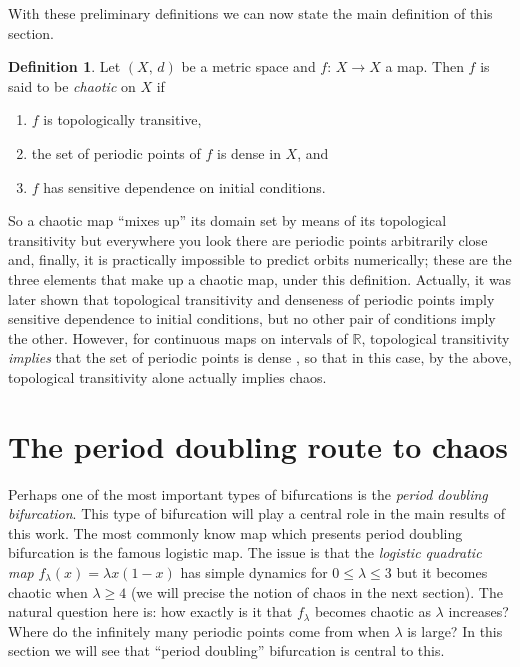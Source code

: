 \documentclass[10pt,twoside,titlepage]{book}
\numberwithin{equation}{chapter}
\numberwithin{figure}{chapter}
\numberwithin{table}{chapter}
\theoremstyle{plain}%
\theoremstyle{definition}
\newtheorem{defn}{Definition}[chapter]
\theoremstyle{remark}
\begin{document}
With these preliminary definitions we can now state the main definition of this section.

\begin{defn}
	Let $(X,\,d)$ be a metric space and $f:\,X\rightarrow X$ a map. Then $f$ is said to be \emph{chaotic} on $X$ if
	\begin{enumerate}
		\item $f$ is topologically transitive,
		\item the set of periodic points of $f$ is dense in $X$, and
		\item $f$ has sensitive dependence on initial conditions.
	\end{enumerate}
\end{defn}

So a chaotic map ``mixes up'' its domain set by means of its topological transitivity but everywhere you look there are periodic points arbitrarily close and, finally, it is practically impossible to predict orbits numerically; these are the three elements that make up a chaotic map, under this definition. Actually, it was later shown \cite{Banks92} that topological transitivity and denseness of periodic points imply sensitive dependence to initial conditions, but no other pair of conditions imply the other. However, for continuous maps on intervals of $\mathbb{R}$, topological transitivity \emph{implies} that the set of periodic points is dense \cite{VellekoopBerglund}, so that in this case, by the above, topological transitivity alone actually implies chaos.

\section{The period doubling route to chaos}
\label{sub:PeriodDoubling}

Perhaps one of the most important types of bifurcations is the \emph{period doubling bifurcation}. This type of bifurcation will play a central role in the main results of this work. The most commonly know map which presents period doubling bifurcation is the famous logistic map. The issue is that the \emph{logistic quadratic map} $f_{\lambda}(x)=\lambda x(1-x)$ has simple dynamics for $0\leq\lambda\leq3$ but it becomes chaotic when $\lambda\geq4$ (we will precise the notion of chaos in the next section). The natural question here is: how exactly is it that $f_{\lambda}$ becomes chaotic as $\lambda$ increases? Where do the infinitely many periodic points come from when $\lambda$ is large? In this section we will see that ``period doubling'' bifurcation is central to this.
\end{document}
